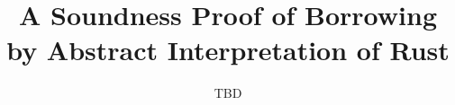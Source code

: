 \documentclass{llncs}
\begin{document}
\title{A Soundness Proof of Borrowing\\by Abstract Interpretation of Rust}
\author{TBD}

\maketitle

\begin{abstract}
  
\end{abstract}











\end{document}

